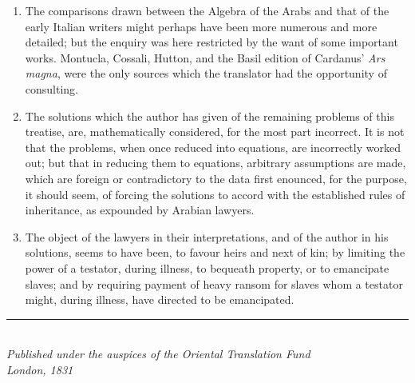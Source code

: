 \begin{enumerate}
\item The comparisons drawn between the Algebra of the Arabs and that of the early Italian writers might perhaps have been more numerous and more detailed; but the enquiry was here restricted by the want of some important works. Montucla, Cossali, Hutton, and the Basil edition of Cardanus' \textit{Ars magna}, were the only sources which the translator had the opportunity of consulting.

\item The solutions which the author has given of the remaining problems of this treatise, are, mathematically considered, for the most part incorrect. It is not that the problems, when once reduced into equations, are incorrectly worked out; but that in reducing them to equations, arbitrary assumptions are made, which are foreign or contradictory to the data first enounced, for the purpose, it should seem, of forcing the solutions to accord with the established rules of inheritance, as expounded by Arabian lawyers.

\item The object of the lawyers in their interpretations, and of the author in his solutions, seems to have been, to favour heirs and next of kin; by limiting the power of a testator, during illness, to bequeath property, or to emancipate slaves; and by requiring payment of heavy ransom for slaves whom a testator might, during illness, have directed to be emancipated.

\end{enumerate}

\vspace{1cm}
\begin{center}
\rule{0.5\textwidth}{1pt}\\[0.5cm]
{\small\textit{Published under the auspices of the Oriental Translation Fund\\London, 1831}}
\end{center}




